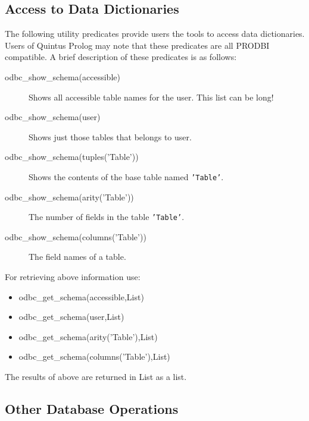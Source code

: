 \subsection{Access to Data Dictionaries}

The following utility predicates provide users the tools to access data 
dictionaries.  Users of Quintus Prolog may note that these predicates are all 
PRODBI compatible.  A brief description of these predicates is as follows:
\begin{description}

\item[odbc\_show\_schema(accessible)]
         Shows all accessible table names for the user.  This list can be long!

\item[odbc\_show\_schema(user)]
        Shows just those tables that belongs to user.

\item[odbc\_show\_schema(tuples('Table'))]
        Shows the contents of the base table named {\tt 'Table'}.

\item[odbc\_show\_schema(arity('Table'))]
        The number of fields in the table {\tt 'Table'}.

\item[odbc\_show\_schema(columns('Table'))]
        The field names of a table.
\end{description}

For retrieving above information use:
\begin{itemize}

\item odbc\_get\_schema(accessible,List)
\item odbc\_get\_schema(user,List)
\item odbc\_get\_schema(arity('Table'),List)
\item odbc\_get\_schema(columns('Table'),List)
\end{itemize}

The results of above are returned in List as a list.

\subsection{Other Database Operations}

